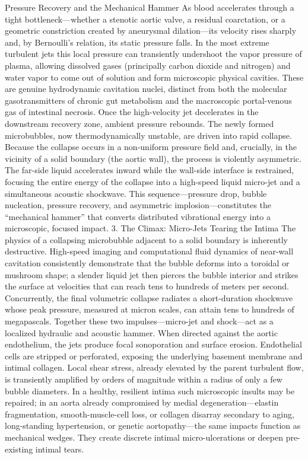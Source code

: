 Pressure Recovery and the Mechanical Hammer
As blood accelerates through a tight bottleneck—whether a stenotic aortic valve, a residual coarctation, or a geometric constriction created by aneurysmal dilation—its velocity rises sharply and, by Bernoulli’s relation, its static pressure falls. In the most extreme turbulent jets this local pressure can transiently undershoot the vapor pressure of plasma, allowing dissolved gases (principally carbon dioxide and nitrogen) and water vapor to come out of solution and form microscopic physical cavities. These are genuine hydrodynamic cavitation nuclei, distinct from both the molecular gasotransmitters of chronic gut metabolism and the macroscopic portal-venous gas of intestinal necrosis.
Once the high-velocity jet decelerates in the downstream recovery zone, ambient pressure rebounds. The newly formed microbubbles, now thermodynamically unstable, are driven into rapid collapse. Because the collapse occurs in a non-uniform pressure field and, crucially, in the vicinity of a solid boundary (the aortic wall), the process is violently asymmetric. The far-side liquid accelerates inward while the wall-side interface is restrained, focusing the entire energy of the collapse into a high-speed liquid micro-jet and a simultaneous acoustic shockwave. This sequence—pressure drop, bubble nucleation, pressure recovery, and asymmetric implosion—constitutes the “mechanical hammer” that converts distributed vibrational energy into a microscopic, focused impact.
3. The Climax: Micro-Jets Tearing the Intima
The physics of a collapsing microbubble adjacent to a solid boundary is inherently destructive. High-speed imaging and computational fluid dynamics of near-wall cavitation consistently demonstrate that the bubble deforms into a toroidal or mushroom shape; a slender liquid jet then pierces the bubble interior and strikes the surface at velocities that can reach tens to hundreds of meters per second. Concurrently, the final volumetric collapse radiates a short-duration shockwave whose peak pressure, measured at micron scales, can attain tens to hundreds of megapascals. Together these two impulses—micro-jet and shock—act as a localized hydraulic and acoustic hammer.
When directed against the aortic endothelium, the jets produce focal sonoporation and surface erosion. Endothelial cells are stripped or perforated, exposing the underlying basement membrane and intimal collagen. Local shear stress, already elevated by the parent turbulent flow, is transiently amplified by orders of magnitude within a radius of only a few bubble diameters. In a healthy, resilient intima such microscopic insults may be repaired; in an aorta already compromised by medial degeneration—elastin fragmentation, smooth-muscle-cell loss, or collagen disarray secondary to aging, long-standing hypertension, or genetic aortopathy—the same impacts function as mechanical wedges. They create discrete intimal micro-ulcerations or deepen pre-existing intimal tears.
